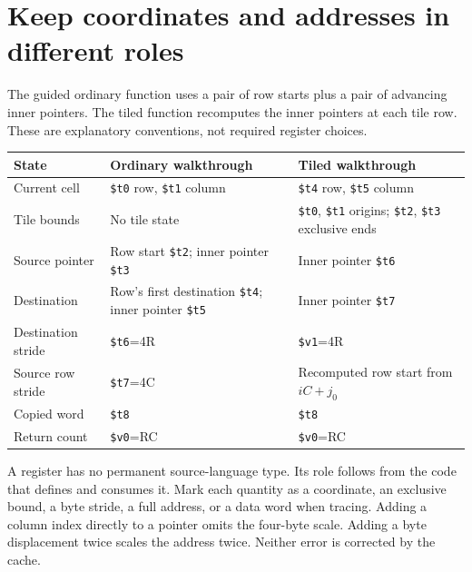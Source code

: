 \section{Keep coordinates and addresses in different roles}\label{transpose-x-registers}
The guided ordinary function uses a pair of row starts plus a pair of advancing
inner pointers. The tiled function recomputes the inner pointers at each tile row.
These are explanatory conventions, not required register choices.
\begin{longtable}{p{26mm}p{64mm}p{57mm}}
  \toprule
  State              & Ordinary walkthrough                                               & Tiled walkthrough                                                                 \\
  \midrule
  Current cell       & \texttt{\$t0} row, \texttt{\$t1} column                            & \texttt{\$t4} row, \texttt{\$t5} column                                           \\
  Tile bounds        & No tile state                                                      & \texttt{\$t0}, \texttt{\$t1} origins; \texttt{\$t2}, \texttt{\$t3} exclusive ends \\
  Source pointer     & Row start \texttt{\$t2}; inner pointer \texttt{\$t3}               & Inner pointer \texttt{\$t6}                                                       \\
  Destination        & Row's first destination \texttt{\$t4}; inner pointer \texttt{\$t5} & Inner pointer \texttt{\$t7}                                                       \\
  Destination stride & \texttt{\$t6}=4R                                                   & \texttt{\$v1}=4R                                                                  \\
  Source row stride  & \texttt{\$t7}=4C                                                   & Recomputed row start from \(iC+j_0\)                                              \\
  Copied word        & \texttt{\$t8}                                                      & \texttt{\$t8}                                                                     \\
  Return count       & \texttt{\$v0}=RC                                                   & \texttt{\$v0}=RC                                                                  \\
  \bottomrule
\end{longtable}
A register has no permanent source-language type. Its role follows from the code
that defines and consumes it. Mark each quantity as a coordinate, an exclusive
bound, a byte stride, a full address, or a data word when tracing. Adding a column
index directly to a pointer omits the four-byte scale. Adding a byte displacement
twice scales the address twice. Neither error is corrected by the cache.
